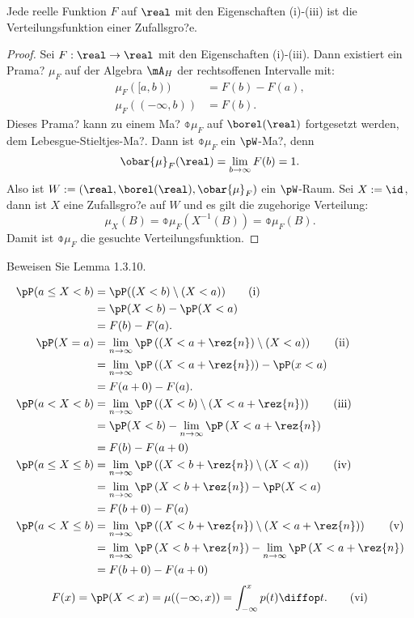 Jede reelle Funktion $F$ auf $\real$ mit den Eigenschaften (i)-(iii) ist die
Verteilungsfunktion einer Zufallsgro?e.

\begin{proof}
  Sei $F: \real \to \real$ mit den Eigenschaften (i)-(iii). Dann existiert ein
  Prama? $\mu_F$ auf der Algebra $\mA_H$ der rechtsoffenen Intervalle mit:
  \begin{align*}
    \mu_F( [a,b) ) &= F(b) - F(a), \\
    \mu_F((-\infty,b)) &= F(b).
  \end{align*}
  Dieses Prama? kann zu einem Ma? $\obar{\mu}_F$ auf $\borel(\real)$ fortgesetzt
  werden, dem Lebesgue-Stieltjes-Ma?. Dann ist $\obar{\mu}_F$ ein $\pW$-Ma?,
  denn
  \[ \obar{\mu}_F(\real) = \lim_{b \to \infty} F(b) = 1. \]
  Also ist $W := (\real, \borel(\real), \obar{\mu}_F)$ ein $\pW$-Raum. Sei $X :=
  \id$, dann ist $X$ eine Zufallsgro?e auf $W$ und es gilt die zugehorige
  Verteilung:
  \[ \mu_X(B) = \obar{\mu}_F(X^{-1}(B)) = \obar{\mu}_F(B). \]
  Damit ist $\obar{\mu}_F$ die gesuchte Verteilungsfunktion.
\end{proof}

\begin{aufg}
  Beweisen Sie Lemma 1.3.10.
\end{aufg}
\begin{align*}
  \pP(a \le X < b )
  &= \pP((X<b)\setminus(X<a)) \tag{i} \\
  &= \pP(X<b) - \pP(X<a) \\
  &= F(b) - F(a). \\
  \pP(X = a)
  &= \lim_{n \to \infty} \pP \left( \left( X < a + \rez{n} \right) \setminus (X<a) \right) \tag{ii} \\
  &= \lim_{n \to \infty} \pP \left( \left( X < a + \rez{n} \right) \right) - \pP(x<a) \\
  &= F(a+0) - F(a). \\
  \pP(a < X < b)
  &= \lim_{n \to \infty} \pP \left( (X<b) \setminus \left( X < a + \rez{n} \right) \right) \tag{iii} \\
  &= \pP(X < b) - \lim_{n \to \infty} \pP \left( X < a + \rez{n} \right) \\
  &= F(b) - F(a+0) \\
  \pP(a \le X \le b)
  &= \lim_{n \to \infty} \pP \left( \left(X<b + \rez{n} \right) \setminus ( X < a ) \right) \tag{iv} \\
  &= \lim_{n \to \infty} \pP \left( X < b + \rez{n} \right) - \pP(X<a) \\
  &= F(b+0) - F(a) \\
  \pP(a < X \le b)
  &= \lim_{n \to \infty} \pP \left( \left(X<b + \rez{n} \right) \setminus \left(X < a + \rez{n} \right) \right) \tag{v} \\
  &= \lim_{n \to \infty} \pP \left( X < b + \rez{n} \right) -
    \lim_{n \to \infty} \pP \left( X < a + \rez{n} \right) \\
  &= F(b+0) - F(a+0)
\end{align*}
\[ F(x) = \pP(X < x) = \mu((-\infty,x)) = \int_{-\infty}^x p(t) \diffop
  t. \tag{vi} \]

